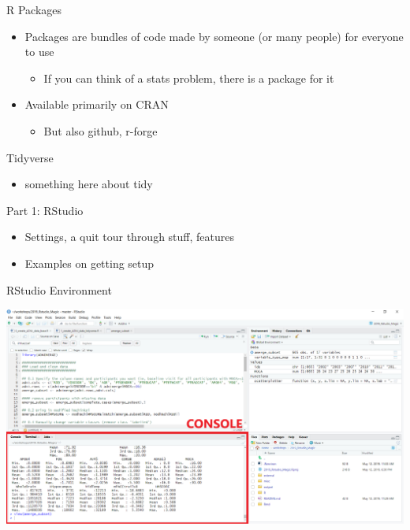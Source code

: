 \documentclass[
  ignorenonframetext,
]{beamer}
\providecommand{\tightlist}{%
  \setlength{\itemsep}{0pt}\setlength{\parskip}{0pt}}
\begin{document}
\begin{frame}{R Packages}
\protect\hypertarget{r-packages}{}

\begin{itemize}
\tightlist
\item
  Packages are bundles of code made by someone (or many people) for
  everyone to use

  \begin{itemize}
  \tightlist
  \item
    If you can think of a stats problem, there is a package for it
  \end{itemize}
\item
  Available primarily on CRAN

  \begin{itemize}
  \tightlist
  \item
    But also github, r-forge
  \end{itemize}
\end{itemize}

\end{frame}

\begin{frame}{Tidyverse}
\protect\hypertarget{tidyverse}{}

\begin{itemize}
\tightlist
\item
  something here about tidy
\end{itemize}

\end{frame}

\begin{frame}{Part 1: RStudio}
\protect\hypertarget{part-1-rstudio}{}

\begin{itemize}
\tightlist
\item
  Settings, a quit tour through stuff, features
\item
  Examples on getting setup
\end{itemize}

\end{frame}

\begin{frame}{RStudio Environment}
\protect\hypertarget{rstudio-environment}{}

\includegraphics{../external/images/rstudio_terminal_1_CONSOLE.png}

\end{frame}
\end{document}
